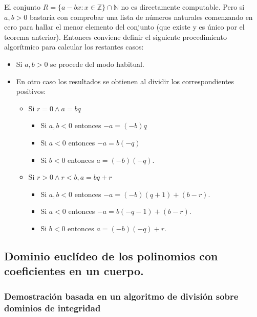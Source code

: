 El conjunto $R = \{a-bx:x \in \mathbb{Z}\} \cap \mathbb{N}$ no es directamente computable. Pero si $a,b > 0$ bastaría con comprobar una lista de números naturales comenzando en cero para hallar el menor elemento del conjunto (que existe y es único por el teorema anterior). Entonces conviene definir el siguiente procedimiento algorítmico para calcular los restantes casos:

\begin{theorem}
	\begin{itemize}
		\item Si $a,b > 0$ se procede del modo habitual. 
		\item En otro caso los resultados se obtienen al dividir los correspondientes positivos:
		\begin{itemize}
			\item Si $r = 0 \land a = bq$
			
			\begin{itemize}
				\item Si $a,b < 0$ entonces $-a = (-b)q$
				\item Si $a < 0$ entonces $-a = b(-q)$
				\item Si $b < 0$ entonces $a = (-b)(-q)$.
			\end{itemize}
			\item Si $r > 0 \land r < b, a = bq+r$
			
			\begin{itemize}
				\item Si $a,b < 0$ entonces $-a = (-b)(q+1)+(b-r)$.
				\item Si $a < 0$ entonces $-a = b(-q-1)+(b-r)$.
				\item Si $b < 0$ entonces $a = (-b)(-q)+r$. 
			\end{itemize}
		\end{itemize}
	\end{itemize}
\end{theorem}

\subsection{Dominio euclídeo de los polinomios con coeficientes en un cuerpo.}

\subsubsection{Demostración basada en un algoritmo de división sobre dominios de integridad}

